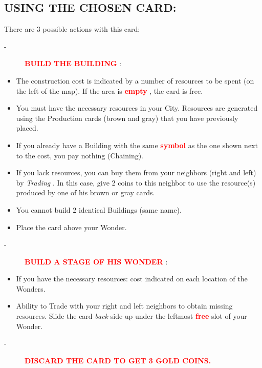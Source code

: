 \documentclass{scrartcl}%
\begin{document}
\subsection{ USING THE CHOSEN CARD:
}%
\label{subsec:USINGTHECHOSENCARD}%
There are 3 possible actions with this card:
%
\begin{description}%
\item[{-} ]%
%
\textcolor{red}{%
\textbf{BUILD THE BUILDING}%
}%
:
%
\end{description}%
\begin{itemize}%
\item%
%
 The construction cost is indicated by a number of resources to be spent (on the left of the map). If the area is %
\textcolor{red}{%
\textbf{empty}%
}%
, the card is free.
%
\item%
%
 You must have the necessary resources in your City. Resources are generated using the Production cards (brown and gray) that you have previously placed.
%
\item%
%
 If you already have a Building with the same %
\textcolor{red}{%
\textbf{symbol}%
}%
\textit{ }%
 as the one shown next to the cost, you pay nothing (Chaining).
%
\item%
%
 If you lack resources, you can buy them from your neighbors (right and left) by %
\textit{Trading}%
. In this case, give 2 coins to this neighbor to use the resource(s) produced by one of his brown or gray cards.
%
\item%
%
 You cannot build 2 identical Buildings (same name).
%
\item%
%
 Place the card above your Wonder.
%
\end{itemize}%
\begin{description}%
\item[{-} ]%
%
\textcolor{red}{%
\textbf{BUILD A STAGE OF HIS WONDER}%
}%
:
%
\end{description}%
\begin{itemize}%
\item%
%
 If you have the necessary resources: cost indicated on each location of the Wonders.
%
\item%
%
 Ability to Trade with your right and left neighbors to obtain missing resources. Slide the card %
\textit{back}%
\textit{ }%
 side up under the leftmost %
\textcolor{red}{%
\textbf{free}%
}%
\textit{ }%
 slot of your Wonder.
%
\end{itemize}%
\begin{description}%
\item[{-} ]%
%
\textcolor{red}{%
\textbf{DISCARD THE CARD TO GET 3 GOLD COINS.}%
}%

%
\end{description}
\end{document}
